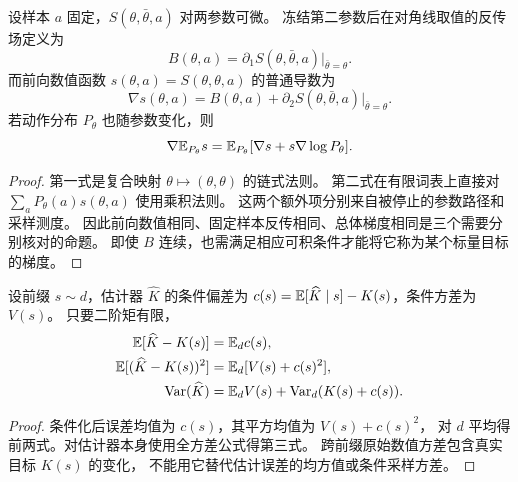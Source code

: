 \begin{proposition}[停止梯度的双参数表示]
\label{prop:stopgrad-diagonal}
设样本 $a$ 固定，$S(\theta,\bar\theta,a)$ 对两参数可微。
冻结第二参数后在对角线取值的反传场定义为
\begin{equation}
B(\theta,a)=\partial_1S(\theta,\bar\theta,a)|_{\bar\theta=\theta}.
\end{equation}
而前向数值函数 $s(\theta,a)=S(\theta,\theta,a)$ 的普通导数为
\begin{equation}
\nabla s(\theta,a)=B(\theta,a)
+\partial_2S(\theta,\bar\theta,a)|_{\bar\theta=\theta}.
\end{equation}
若动作分布 $P_\theta$ 也随参数变化，则
\begin{equation}
\nabla\mathbb E_{P_\theta}s
=\mathbb E_{P_\theta}[\nabla s+s\nabla\log P_\theta].
\end{equation}
\end{proposition}
\begin{proof}
第一式是复合映射 $\theta\mapsto(\theta,\theta)$ 的链式法则。
第二式在有限词表上直接对 $\sum_aP_\theta(a)s(\theta,a)$ 使用乘积法则。
这两个额外项分别来自被停止的参数路径和采样测度。
因此前向数值相同、固定样本反传相同、总体梯度相同是三个需要分别核对的命题。
即使 $B$ 连续，也需满足相应可积条件才能将它称为某个标量目标的梯度。
\end{proof}

\begin{proposition}[前缀混合下的误差与方差口径]
\label{prop:prefix-mse}
设前缀 $s\sim d$，估计器 $\widehat K$ 的条件偏差为
$c(s)=\mathbb E[\widehat K\mid s]-K(s)$，条件方差为 $V(s)$。
只要二阶矩有限，
\begin{align}
\mathbb E[\widehat K-K(s)]&=\mathbb E_dc(s),\\
\mathbb E[(\widehat K-K(s))^2]&=\mathbb E_d[V(s)+c(s)^2],\\
\operatorname{Var}(\widehat K)&=\mathbb E_dV(s)+\operatorname{Var}_d(K(s)+c(s)).
\end{align}
\end{proposition}
\begin{proof}
条件化后误差均值为 $c(s)$，其平方均值为 $V(s)+c(s)^2$，
对 $d$ 平均得前两式。对估计器本身使用全方差公式得第三式。
跨前缀原始数值方差包含真实目标 $K(s)$ 的变化，
不能用它替代估计误差的均方值或条件采样方差。
\end{proof}
